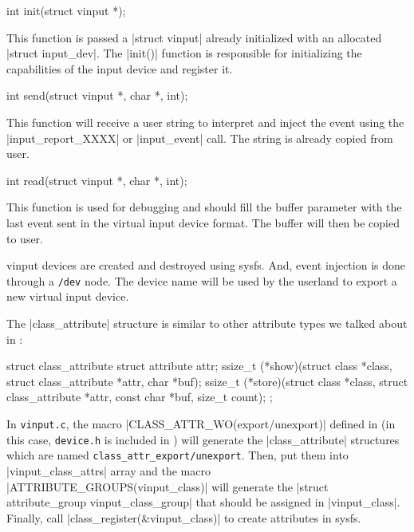 \documentclass[10pt, oneside]{book}
\begin{document}
\begin{code}
int init(struct vinput *);
\end{code}

This function is passed a \cpp|struct vinput| already initialized with an allocated \cpp|struct input_dev|.
The \cpp|init()| function is responsible for initializing the capabilities of the input device and register it.

\begin{code}
int send(struct vinput *, char *, int);
\end{code}

This function will receive a user string to interpret and inject the event using the \cpp|input_report_XXXX| or \cpp|input_event| call.
The string is already copied from user.

\begin{code}
int read(struct vinput *, char *, int);
\end{code}

This function is used for debugging and should fill the buffer parameter with the last event sent in the virtual input device format.
The buffer will then be copied to user.

vinput devices are created and destroyed using sysfs.
And, event injection is done through a \verb|/dev| node.
The device name will be used by the userland to export a new virtual input device.

The \cpp|class_attribute| structure is similar to other attribute types we talked about in :

\begin{code}
struct class_attribute {
    struct attribute attr;
    ssize_t (*show)(struct class *class, struct class_attribute *attr,
                    char *buf);
    ssize_t (*store)(struct class *class, struct class_attribute *attr,
                    const char *buf, size_t count);
};
\end{code}

In \verb|vinput.c|, the macro \cpp|CLASS_ATTR_WO(export/unexport)| defined in  (in this case, \verb|device.h| is included in ) will generate the \cpp|class_attribute| structures which are named \verb|class_attr_export/unexport|.
Then, put them into \cpp|vinput_class_attrs| array and the macro \cpp|ATTRIBUTE_GROUPS(vinput_class)| will generate the \cpp|struct attribute_group vinput_class_group| that should be assigned in \cpp|vinput_class|.
Finally, call \cpp|class_register(&vinput_class)| to create attributes in sysfs.
\end{document}
